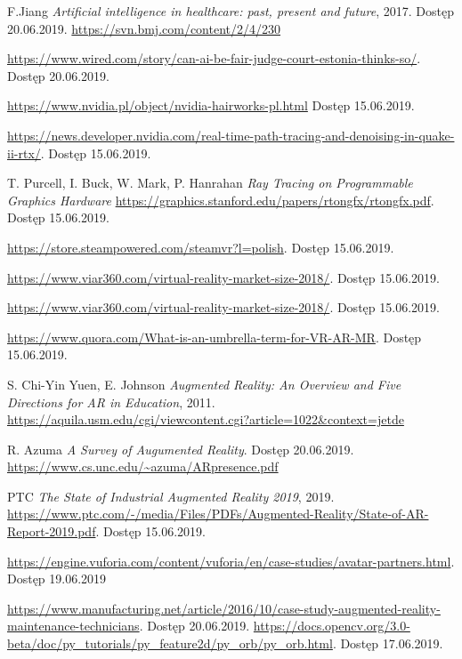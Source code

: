 \documentclass[12pt,twoside,polish]{article}
\begin{document}
\begin{thebibliography}{11}
F.Jiang \emph{Artificial intelligence in healthcare: past, present and future}, 2017. Dostęp 20.06.2019.
\url{https://svn.bmj.com/content/2/4/230}

\url{https://www.wired.com/story/can-ai-be-fair-judge-court-estonia-thinks-so/}. Dostęp 20.06.2019.

\url{https://www.nvidia.pl/object/nvidia-hairworks-pl.html} Dostęp 15.06.2019.

\url{https://news.developer.nvidia.com/real-time-path-tracing-and-denoising-in-quake-ii-rtx/}. Dostęp 15.06.2019.

T. Purcell, I. Buck, W. Mark, P. Hanrahan \emph{Ray Tracing on Programmable Graphics Hardware}
\url{https://graphics.stanford.edu/papers/rtongfx/rtongfx.pdf}. Dostęp 15.06.2019.

\url{https://store.steampowered.com/steamvr?l=polish}. Dostęp 15.06.2019. 

\url{https://www.viar360.com/virtual-reality-market-size-2018/}. Dostęp 15.06.2019.

\url{https://www.viar360.com/virtual-reality-market-size-2018/}. Dostęp 15.06.2019. 

\url{https://www.quora.com/What-is-an-umbrella-term-for-VR-AR-MR}. Dostęp 15.06.2019.

S. Chi-Yin Yuen, E. Johnson \emph{Augmented Reality: An Overview and Five Directions for AR in Education}, 2011.
\url{https://aquila.usm.edu/cgi/viewcontent.cgi?article=1022&context=jetde}

R. Azuma \emph{A Survey of Augumented Reality}. Dostęp 20.06.2019.
\url{https://www.cs.unc.edu/~azuma/ARpresence.pdf}

PTC \emph{The State of Industrial Augmented Reality 2019}, 2019.
\url{https://www.ptc.com/-/media/Files/PDFs/Augmented-Reality/State-of-AR-Report-2019.pdf}. Dostęp 15.06.2019.

\url{https://engine.vuforia.com/content/vuforia/en/case-studies/avatar-partners.html}. Dostęp 19.06.2019

\url{https://www.manufacturing.net/article/2016/10/case-study-augmented-reality-maintenance-technicians}. Dostęp 20.06.2019.
\url{https://docs.opencv.org/3.0-beta/doc/py_tutorials/py_feature2d/py_orb/py_orb.html}. Dostęp 17.06.2019.


\end{thebibliography}
\end{document}
